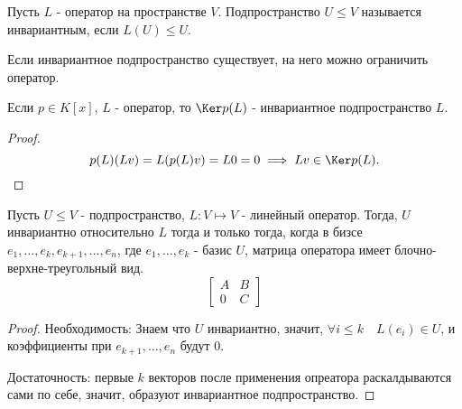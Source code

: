 \begin{definition} \thmslashn 

    Пусть $L$ - оператор на пространстве $V$. Подпространство $U \le V$ называется инвариантным, если $L(U) \le U$.
\end{definition}
\begin{remark} \thmslashn

    Если инвариантное подпространство существует, на него можно ограничить оператор.
\end{remark}
\begin{lemma} \thmslashn

    Если $p\in K[x]$, $L$ - оператор, то $\Ker p(L)$ - инвариантное подпространство $L$.
    \begin{proof} \thmslashn
    
        \[ p(L)(Lv) = L(p(L)v) = L 0 = 0 \implies Lv\in \Ker p(L) .\] 
    \end{proof}
\end{lemma}
\begin{lemma} \thmslashn

    Пусть $U \le V$ - подпространство, $L : V \mapsto V$ - линейный оператор. Тогда, $U$ инвариантно относительно $L$ тогда и только тогда, когда в бизсе $e_1, \ldots, e_{k}, e_{k+1}, \ldots, e_{n}$, где $e_1, \ldots, e_{k}$ - базис $U$, матрица оператора имеет блочно-верхне-треугольный вид.
    \begin{equation*}
        \begin{bmatrix} 
            A & B\\
            0 & C
        \end{bmatrix} 
    \end{equation*}
    \begin{proof} \thmslashn
    
        Необходимость: Знаем что $U$ инвариантно, значит, $\forall{i \le k}\quad L(e_{i})\in U$, и коэффициенты при $e_{k+1}, \ldots, e_{n}$ будут $0$.

        Достаточность: первые $k$ векторов после применения опреатора раскалдываются сами по себе, значит, образуют инвариантное подпространство.
    \end{proof}
\end{lemma}
